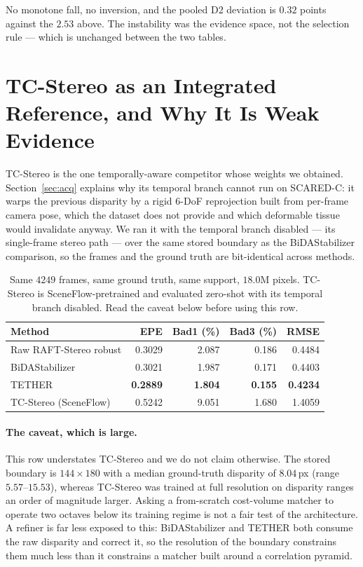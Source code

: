 \documentclass[letterpaper,10pt,conference]{ieeeconf}
\begin{document}
No monotone fall, no inversion, and the pooled D2 deviation is $0.32$ points
against the $2.53$ above. The instability was the evidence space, not the
selection rule --- which is unchanged between the two tables.

\section{TC-Stereo as an Integrated Reference, and Why It Is Weak Evidence}

TC-Stereo \cite{zeng2024tcstereo} is the one temporally-aware competitor
whose weights we obtained. Section~\ref{sec:acq} explains why its temporal
branch cannot run on SCARED-C: it warps the previous disparity by a rigid
$6$-DoF reprojection built from per-frame camera pose, which the dataset
does not provide and which deformable tissue would invalidate anyway. We
ran it with the temporal branch disabled --- its single-frame stereo path
--- over the same stored boundary as the BiDAStabilizer comparison, so the
frames and the ground truth are bit-identical across methods.

\begin{table}[!htb]
\centering
\caption{Same $4249$ frames, same ground truth, same support, $18.0$M
pixels. TC-Stereo is SceneFlow-pretrained and evaluated zero-shot with its
temporal branch disabled. Read the caveat below before using this row.}
\label{tab:tcstereo}
\setlength{\tabcolsep}{4pt}
\footnotesize
\begin{tabular}{@{}lrrrr@{}}
\toprule
Method & EPE & Bad1 (\%) & Bad3 (\%) & RMSE \\
\midrule
Raw RAFT-Stereo robust & 0.3029 & 2.087 & 0.186 & 0.4484 \\
BiDAStabilizer         & 0.3021 & 1.987 & 0.171 & 0.4403 \\
TETHER                 & \textbf{0.2889} & \textbf{1.804} & \textbf{0.155} & \textbf{0.4234} \\
\midrule
TC-Stereo (SceneFlow)  & 0.5242 & 9.051 & 1.680 & 1.4059 \\
\bottomrule
\end{tabular}
\end{table}

\paragraph{The caveat, which is large.} This row understates TC-Stereo and
we do not claim otherwise. The stored boundary is $144\times180$ with a
median ground-truth disparity of $8.04$\,px (range $5.57$--$15.53$),
whereas TC-Stereo was trained at full resolution on disparity ranges an
order of magnitude larger. Asking a from-scratch cost-volume matcher to
operate two octaves below its training regime is not a fair test of the
architecture. A refiner is far less exposed to this: BiDAStabilizer and
TETHER both consume the raw disparity and correct it, so the resolution
of the boundary constrains them much less than it constrains a matcher
built around a correlation pyramid.
\end{document}
